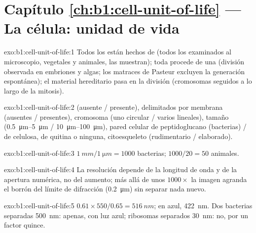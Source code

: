 \section*{Capítulo \ref{ch:b1:cell-unit-of-life} --- La célula: unidad de vida}

\begin{solution}{exo:b1:cell-unit-of-life:1}
Todos los  están hechos de  (todos los  examinados
al microscopio, vegetales y animales, las muestran); toda  procede de
una  (división observada en embriones y algas; los matraces de Pasteur
excluyen la generación espontánea); el material hereditario pasa en la
división (cromosomas seguidos a lo largo de la mitosis).
\end{solution}

\begin{solution}{exo:b1:cell-unit-of-life:2}
 (ausente / presente),  delimitados por membrana (ausentes /
presentes), cromosoma (uno circular / varios lineales), tamaño
(\qtyrange{0.5}{5}{\micro m} / \qtyrange{10}{100}{\micro m}), pared celular
de peptidoglucano (bacterias) / de celulosa, de quitina o ninguna,
citoesqueleto (rudimentario / elaborado).
\end{solution}

\begin{solution}{exo:b1:cell-unit-of-life:3}
$\qty{1}{mm}/\qty{1}{\micro m} = 1000$ bacterias; $1000/20 = 50$ 
animales.
\end{solution}

\begin{solution}{exo:b1:cell-unit-of-life:4}
La resolución depende de la longitud de onda y de la apertura numérica, no
del aumento; más allá de unos $1000\times$ la imagen agranda el borrón del
límite de difracción (\qty{0.2}{\micro m}) sin separar nada nuevo.
\end{solution}

\begin{solution}{exo:b1:cell-unit-of-life:5}
$0.61\times 550/0.65 = \qty{516}{nm}$; en azul, \qty{422}{nm}. Dos bacterias
separadas \qty{500}{nm}: apenas, con luz azul; ribosomas separados
\qty{30}{nm}: no, por un factor quince.
\end{solution}

